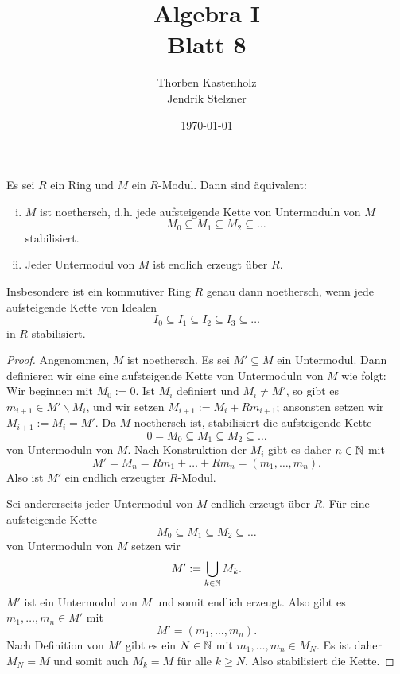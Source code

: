 \documentclass[a4paper,10pt]{article}
\title{\sc Algebra I \\ \Large Blatt 8}
\author{Thorben Kastenholz \\ Jendrik Stelzner}
\date{\today}
\begin{document}
\maketitle

\section{}

\begin{lem}\label{lem: Äquivalente Definitionen von noethersch}
 Es sei $R$ ein Ring und $M$ ein $R$-Modul. Dann sind äquivalent:
 \begin{enumerate}[i)]
  \item $M$ ist noethersch, d.h. jede aufsteigende Kette von Untermoduln von $M$
  \[
   M_0 \subseteq M_1 \subseteq M_2 \subseteq \ldots
  \]
  stabilisiert.
  \item Jeder Untermodul von $M$ ist endlich erzeugt über $R$.
 \end{enumerate}
 Insbesondere ist ein kommutiver Ring $R$ genau dann noethersch, wenn jede aufsteigende Kette von Idealen
 \[
  I_0 \subseteq I_1 \subseteq I_2 \subseteq I_3 \subseteq \ldots
 \]
 in $R$ stabilisiert.
\end{lem}
\begin{proof}
 Angenommen, $M$ ist noethersch. Es sei $M' \subseteq M$ ein Untermodul. Dann definieren wir eine eine aufsteigende Kette von Untermoduln von $M$ wie folgt: Wir beginnen mit $M_0 := 0$. Ist $M_i$ definiert und $M_i \neq M'$, so gibt es $m_{i+1} \in M' \smallsetminus M_i$, und wir setzen $M_{i+1} := M_i + R m_{i+1}$; ansonsten setzen wir $M_{i+1} := M_i = M'$. Da $M$ noethersch ist, stabilisiert die aufsteigende Kette
 \[
  0 = M_0 \subseteq M_1 \subseteq M_2 \subseteq \ldots
 \]
 von Untermoduln von $M$. Nach Konstruktion der $M_i$ gibt es daher $n \in \mathbb{N}$ mit
 \[
  M' = M_n = Rm_1 + \ldots + Rm_n = (m_1, \ldots, m_n).
 \]
 Also ist $M'$ ein endlich erzeugter $R$-Modul.
 
 Sei andererseits jeder Untermodul von $M$ endlich erzeugt über $R$. Für eine aufsteigende Kette
 \[
  M_0 \subseteq M_1 \subseteq M_2 \subseteq \ldots
 \]
 von Untermoduln von $M$ setzen wir
 \[
  M' := \bigcup_{k \in \mathbb{N}} M_k.
 \]
 $M'$ ist ein Untermodul von $M$ und somit endlich erzeugt. Also gibt es $m_1, \ldots, m_n \in M'$ mit
 \[
  M' = (m_1, \ldots, m_n).
 \]
 Nach Definition von $M'$ gibt es ein $N \in \mathbb{N}$ mit $m_1, \ldots, m_n \in M_N$. Es ist daher $M_N = M$ und somit auch $M_k = M$ für alle $k \geq N$. Also stabilisiert die Kette.
\end{proof}
\end{document}

